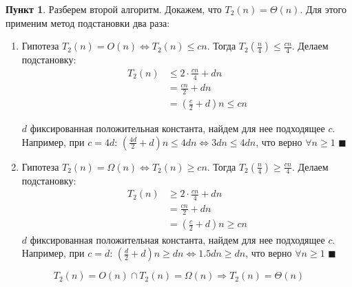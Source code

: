\documentclass[11pt,a4paper]{scrarticle}
\theoremstyle{definition}
\newtheorem{subtask}{Пункт}
\begin{document}
\begin{subtask}


	Разберем второй алгоритм. Докажем, что $T_2(n) = \Theta(n)$. Для этого применим метод подстановки два раза:

	\begin{enumerate}
		\item Гипотеза $T_2(n) = O(n) \Leftrightarrow T_2(n) \leq cn$. Тогда
		      $T_2\left(\frac{n}{4}\right) \leq \frac{cn}{4}$. Делаем подстановку:
		      \begin{align*}
			      T_2(n) & \leq 2 \cdot \frac{cn}{4} + dn           \\
			             & = \frac{cn}{2} + dn                      \\
			             & = \left(\frac{c}{2} + d\right) n \leq cn
		      \end{align*}

		      $d$ фиксированная положительная константа, найдем для нее подходящее $c$.
		      Например, при $c = 4d$: $\left(\frac{4d}{2} + d\right) n \leq 4dn \Leftrightarrow 3d n \leq 4d n$, что верно $\forall n \geq 1$ $\blacksquare$
		\item Гипотеза $T_2(n) = \Omega(n) \Leftrightarrow T_2(n) \geq cn$. Тогда
		      $T_2\left(\frac{n}{4}\right) \geq \frac{cn}{4}$. Делаем подстановку:
		      \begin{align*}
			      T_2(n) & \geq 2 \cdot \frac{cn}{4} + dn           \\
			             & = \frac{cn}{2} + dn                      \\
			             & = \left(\frac{c}{2} + d\right) n \geq cn
		      \end{align*}
		      $d$ фиксированная положительная константа, найдем для нее подходящее $c$.
		      Например, при $c = d$: $\left(\frac{d}{2} + d\right) n \geq dn \Leftrightarrow 1.5d n \geq d n$, что верно $\forall n \geq 1$ $\blacksquare$
	\end{enumerate}

	$$
		T_2(n) = O(n) \cap T_2(n) = \Omega(n) \Longrightarrow T_2(n) = \Theta(n)
	$$
\end{subtask}
\end{document}
